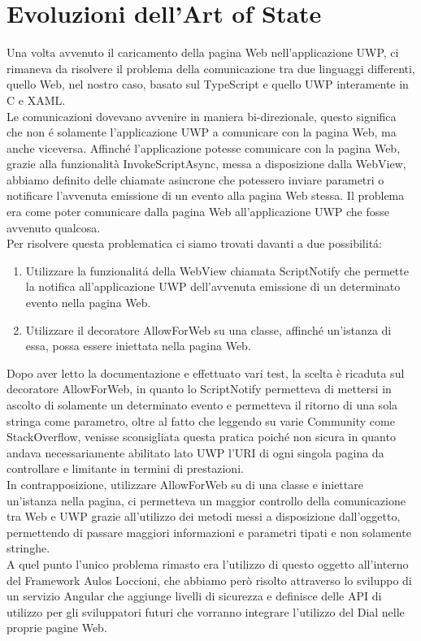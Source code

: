 \section{Evoluzioni dell'Art of State}


Una volta avvenuto il caricamento della pagina Web nell'applicazione UWP, ci rimaneva da risolvere il problema della comunicazione tra due linguaggi differenti, quello Web, nel nostro caso, basato sul TypeScript e quello UWP interamente in C e XAML.\\

Le comunicazioni dovevano avvenire in maniera bi-direzionale, questo significa che non é solamente l'applicazione UWP a comunicare con la pagina Web, ma anche viceversa. Affinché l'applicazione potesse comunicare con la pagina Web, grazie alla funzionalità InvokeScriptAsync, messa a disposizione dalla WebView, abbiamo definito delle chiamate asincrone che potessero inviare parametri o notificare l'avvenuta emissione di un evento alla pagina Web stessa. Il problema era come poter comunicare dalla pagina Web all'applicazione UWP che fosse avvenuto qualcosa.\\

Per risolvere questa problematica ci siamo trovati davanti a due possibilitá:

\begin{enumerate}
\item Utilizzare la funzionalitá della WebView chiamata ScriptNotify che permette la notifica all'applicazione UWP dell'avvenuta emissione di un determinato evento nella pagina Web.
\item Utilizzare il decoratore AllowForWeb su una classe, affinché un'istanza di essa, possa essere iniettata nella pagina Web.
\end{enumerate}

Dopo aver letto la documentazione e effettuato vari test, la scelta è ricaduta sul decoratore AllowForWeb, in quanto lo ScriptNotify permetteva di mettersi in ascolto di solamente un determinato evento e permetteva il ritorno di una sola stringa come parametro, oltre al fatto che leggendo su varie Community come StackOverflow, venisse sconsigliata questa pratica poiché non sicura in quanto andava necessariamente abilitato lato UWP l'URI di ogni singola pagina da controllare e limitante in termini di prestazioni.\\ 

In contrapposizione, utilizzare AllowForWeb su di una classe e iniettare un'istanza nella pagina, ci permetteva un maggior controllo della comunicazione tra Web e UWP grazie all'utilizzo dei metodi messi a disposizione dall'oggetto, permettendo di passare maggiori informazioni e parametri tipati e non solamente stringhe.\\ 

A quel punto l’unico problema rimasto era l’utilizzo di questo oggetto all’interno del Framework Aulos Loccioni, che abbiamo però risolto attraverso lo sviluppo di un servizio Angular che aggiunge livelli di sicurezza e definisce delle API di utilizzo per gli sviluppatori futuri che vorranno integrare l'utilizzo del Dial nelle proprie pagine Web.


